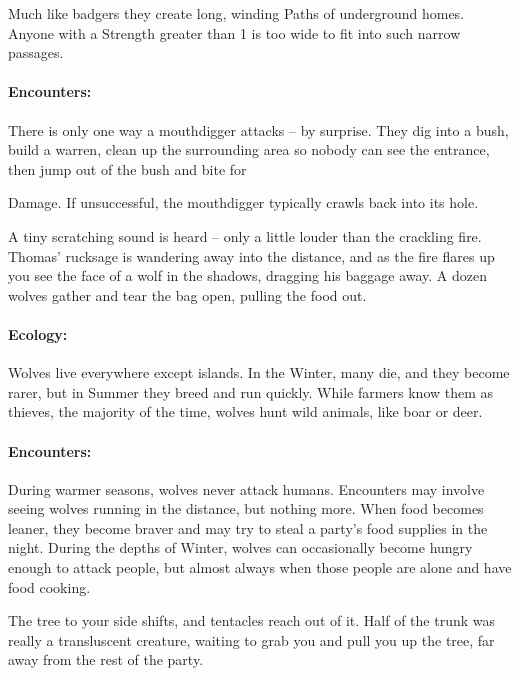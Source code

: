 Much like badgers they create long, winding Paths of underground homes.  Anyone with a Strength greater than 1 is too wide to fit into such narrow passages.

\paragraph{Encounters:} There is only one way a mouthdigger attacks -- by surprise.  They dig into a bush, build a warren, clean up the surrounding area so nobody can see the entrance, then jump out of the bush and bite for \addtocounter{strb}{-5} Damage.  If unsuccessful, the mouthdigger typically crawls back into its hole.

\label{wolf}
\wolf

\begin{boxtext}

	A tiny scratching sound is heard -- only a little louder than the crackling fire.  Thomas' rucksage is wandering away into the distance, and as the fire flares up you see the face of a wolf in the shadows, dragging his baggage away.  A dozen wolves gather and tear the bag open, pulling the food out.

\end{boxtext}

\paragraph{Ecology:} Wolves live everywhere except islands.  In the Winter, many die, and they become rarer, but in Summer they breed and run quickly.  While farmers know them as thieves, the majority of the time, wolves hunt wild animals, like boar or deer.

\paragraph{Encounters:} During warmer seasons, wolves never attack humans.  Encounters may involve seeing wolves running in the distance, but nothing more.  When food becomes leaner, they become braver and may try to steal a party's food supplies in the night.  During the depths of Winter, wolves can occasionally become hungry enough to attack people, but almost always when those people are alone and have food cooking.

\label{woodspy}
\woodspy


\begin{boxtext}

	The tree to your side shifts, and tentacles reach out of it.  Half of the trunk was really a transluscent creature, waiting to grab you and pull you up the tree, far away from the rest of the party.

\end{boxtext}

